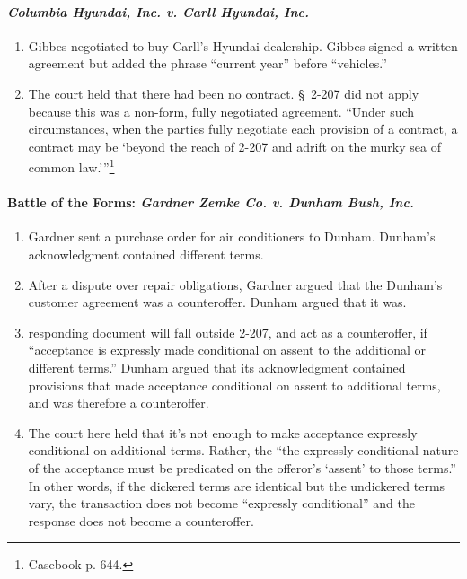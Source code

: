 \paragraph{\emph{Columbia Hyundai, Inc. v. Carll Hyundai, Inc.}}

\begin{enumerate}
    \item Gibbes negotiated to buy Carll's Hyundai dealership. Gibbes signed a 
    written agreement but added the phrase ``current year'' before 
    ``vehicles.''
    \item The court held that there had been no contract. \S\ 2-207 did not 
    apply because this was a non-form, fully negotiated agreement. \enquote{Under 
    such circumstances, when the parties fully negotiate each provision of a 
    contract, a contract may be \enquote{beyond the reach of 2-207 and adrift 
    on the murky sea of common law.}}\footnote{Casebook p. 644.}
\end{enumerate}

\paragraph{Battle of the Forms: \emph{Gardner Zemke Co. v. Dunham Bush, Inc.}}

\begin{enumerate}
    \item Gardner sent a purchase order for air conditioners to Dunham. 
    Dunham's acknowledgment contained different terms.
    \item After a dispute over repair obligations, Gardner argued that the 
    Dunham's customer agreement was a counteroffer. Dunham argued that it was.
    \item  responding document will fall outside 2-207, and act as a 
    counteroffer, if ``acceptance is expressly made conditional on assent to 
    the additional or different terms.'' Dunham argued that its 
    acknowledgment contained provisions that made acceptance conditional on 
    assent to additional terms, and was therefore a counteroffer.
    \item The court here held that it's not enough to make acceptance 
    expressly conditional on additional terms. Rather, the ``the expressly 
    conditional nature of the acceptance must be predicated on the offeror's 
    `assent' to those terms.'' In other words, if the dickered terms are 
    identical but the undickered terms vary, the transaction does not become 
    ``expressly conditional'' and the response does not become a counteroffer.
\end{enumerate}

